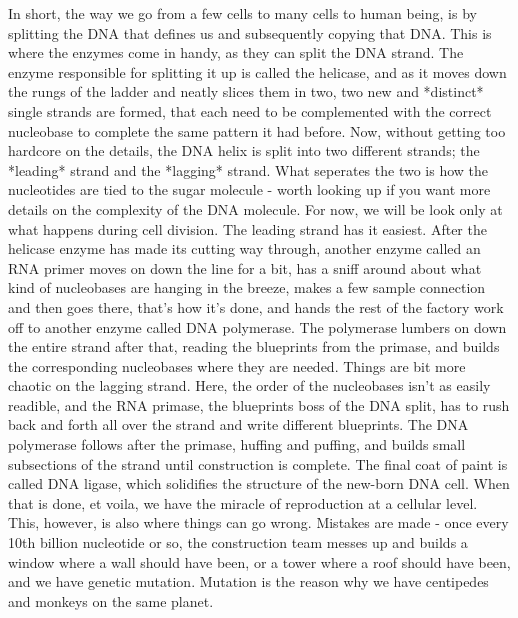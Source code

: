 In short, the way we go from a few cells to many cells to human being, is by splitting the DNA that defines us and subsequently copying that DNA. This is where the enzymes come in handy, as they can split the DNA strand. The enzyme responsible for splitting it up is called the helicase, and as it moves down the rungs of the ladder and neatly slices them in two, two new and *distinct* single strands are formed, that each need to be complemented with the correct nucleobase to complete the same pattern it had before. Now, without getting too hardcore on the details, the DNA helix is split into two different strands; the *leading* strand and the *lagging* strand. What seperates the two is how the nucleotides are tied to the sugar molecule - worth looking up if you want more details on the complexity of the DNA molecule. For now, we will be look only at what happens during cell division.
The leading strand has it easiest. After the helicase enzyme has made its cutting way through, another enzyme called an RNA primer moves on down the line for a bit, has a sniff around about what kind of nucleobases are hanging in the breeze, makes a few sample connection and then goes there, that's how it's done, and hands the rest of the factory work off to another enzyme called DNA polymerase. The polymerase lumbers on down the entire strand after that, reading the blueprints from the primase, and builds the corresponding nucleobases where they are needed. 
Things are bit more chaotic on the lagging strand. Here, the order of the nucleobases isn't as easily readible, and the RNA primase, the blueprints boss of the DNA split, has to rush back and forth all over the strand and write different blueprints. The DNA polymerase follows after the primase, huffing and puffing, and builds small subsections of the strand until construction is complete.
The final coat of paint is called DNA ligase, which solidifies the structure of the new-born DNA cell. When that is done, et voila, we have the miracle of reproduction at a cellular level. 
This, however, is also where things can go wrong. Mistakes are made - once every 10th billion nucleotide or so, the construction team messes up and builds a window where a wall should have been, or a tower where a roof should have been, and we have genetic mutation. Mutation is the reason why we have centipedes and monkeys on the same planet. 

